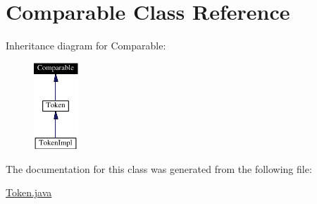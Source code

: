 \hypertarget{classComparable}{
\section{Comparable  Class Reference}
\label{classComparable}
}
Inheritance diagram for Comparable:\begin{figure}[H]
\begin{center}
\leavevmode
\includegraphics[width=47pt]{classComparable__inherit__graph}
\end{center}
\end{figure}


The documentation for this class was generated from the following file:\begin{CompactItemize}
\item 
\hyperlink{Token_8java-source}{Token.java}\end{CompactItemize}
